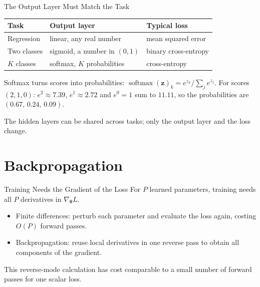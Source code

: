 \documentclass{ntuabeamer}
\begin{document}
\begin{frame}{The Output Layer Must Match the Task}
  \centering
  \begin{tabular}{lll}
    \toprule
    \textbf{Task} & \textbf{Output layer} & \textbf{Typical loss}\\
    \midrule
    Regression & linear, any real number & mean squared error\\
    Two classes & sigmoid, a number in $(0,1)$ & binary cross-entropy\\
    $K$ classes & softmax, $K$ probabilities & cross-entropy\\
    \bottomrule
  \end{tabular}
  \vspace{0.3cm}

  Softmax turns scores into probabilities: $\operatorname{softmax}(\mathbf z)_k=e^{z_k}/\sum_{j}e^{z_j}$.
  For scores $(2,1,0)$: $e^2\approx7.39$, $e^1\approx2.72$ and $e^0=1$ sum to $11.11$, so the probabilities are
  $(0.67,\,0.24,\,0.09)$.

  The hidden layers can be shared across tasks; only the output layer and the loss change.
\end{frame}


\section{Backpropagation}

\begin{frame}{Training Needs the Gradient of the Loss}
  For $P$ learned parameters, training needs all $P$ derivatives in $\nabla_{\boldsymbol\theta}L$.
  \begin{itemize}
    \item Finite differences: perturb each parameter and evaluate the loss again, costing $O(P)$ forward passes.
    \item Backpropagation: reuse local derivatives in one reverse pass to obtain all components of the gradient.
  \end{itemize}
  This reverse-mode calculation has cost comparable to a small number of forward passes for one scalar loss.
\end{frame}
\end{document}
